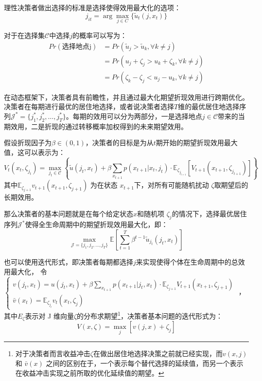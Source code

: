 \documentclass[a4paper,12pt,oneside, fontset=mac]{ctexbook} %
\begin{document}
理性决策者做出选择的标准是选择使得效用最大化的选项：
\begin{equation}
  j_{it} = \arg\max_{j \in C} \{\tilde{u}_t(j, x_t)\}
\end{equation}

对于在选择集$\mathcal{C}$中选择$j$的概率可以写为：
\begin{equation}
\begin{split}
  Pr(\text{选择地点j})&=Pr(\tilde u_j > \tilde u_k, \forall k \neq j)
  \\&=Pr(u_j+\zeta_j>u_k+\zeta_k, \forall k \neq j)
  \\&=Pr(\zeta_k-\zeta_j<u_j-u_k, \forall k \neq j)
\end{split}
\label{eq:C中地点选择j的概率}
\end{equation}

在动态框架下，决策者具有前瞻性，并且通过最大化期望折现效用进行跨期优化。决策者在每期进行最优的居住地选择，或者说决策者选择$T$维的最优居住地选择序列$\mathcal{J}^*=\{j_1^*,j_2^*,\ldots,j_T^*\}$。每期的效用可以分为两部分，一是选择地点$j \in \mathcal{C}$带来的当期效用，二是折现的通过转移概率加权得到的未来期望效用。

假设折现因子为$\beta \in (0,1)$，决策者的目标是为从$t$期开始的期望折现效用最大值，这可以表示为：
\begin{equation}
  V_t(x_t, \zeta_{j_t}) = \max_{j_t \in \mathcal{C}} 
  \left\{ 
  \tilde{u}(j_t, x_t) + \beta \sum_{x_{t+1}} p(x_{t+1} | x_t, j_t) \cdot \mathbb{E}_{\zeta_{j_{t+1}}} [ V_{t+1}(x_{t+1}, \zeta_{j_{t+1}}) ]
  \right\}
\end{equation}
其中$\mathbb{E}_{\zeta_{j+1}} v_{t+1}(x_{t+1},\zeta_{j+1})$
为在状态 
$x_{t+1}$下，对所有可能随机扰动 
$\zeta$取期望后的长期效用。

那么决策者的基本问题就是在每个给定状态$x$和随机项 $\zeta_j$的情况下，选择最优居住序列$\mathcal{J}^*$使得全生命周期中的期望折现效用最大化，即：
\begin{equation}
  \max_{\mathcal{J}=\{j_1,j_2,\ldots,j_T\}} \mathbb{E} [ \sum_{t=1}^{T} \beta^{t-1} \tilde{u}_{j_t}(j_t,x_t) ]
\end{equation}

也可以使用迭代形式，即决策者每期都选择$j$来实现使得个体在生命周期中的总效用最大化，
令
$\begin{cases}
  v(j_{t},x_{t})=u(j_{t} ,x_{t})+\beta \sum_{x_{t+1}} p(x_{t+1}|j_t,x_t) \cdot \mathbb{E}_{\zeta_{j+1}} V_{t+1}(x_{t+1},\zeta_{j+1})
  \\
  \bar v(x_{t})=\mathbb{E}_{\zeta_{j_t}} v_{t}(x_{t},\zeta_{j})
\end{cases}$
，其中$E_{\zeta}$表示对 J 维向量$\zeta$的分布求期望\footnote{对于决策者而言收益冲击$\zeta$在做出居住地选择决策之前就已经实现，而$v(x,j)$ 和 $\bar v(x)$ 之间的区别在于，一个表示每个替代选择的延续值，而另一个表示在收益冲击实现之前所取的优化延续值的期望。}，决策者基本问题的迭代形式为：
\begin{equation}
V(x,\zeta)=\max\limits_{j}[v(j,x)+\zeta_{j}]
\end{equation}
\end{document}
